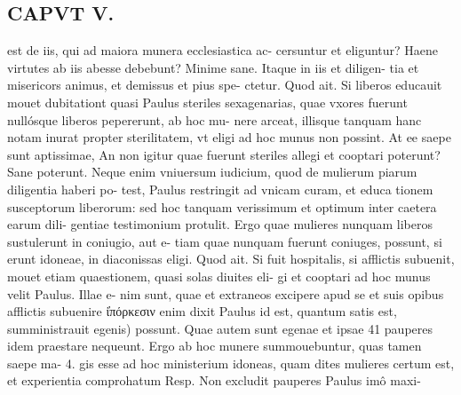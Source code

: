 \documentclass{article}
\begin{document}
\begin{pages}
\section*{CAPVT  V. }
\marginpar{[ p.273 ]}\pstart est de iis, qui ad maiora munera ecclesiastica ac- cersuntur et eliguntur? Haene virtutes ab iis abesse debebunt? Minime sane. Itaque in iis et diligen- tia et misericors animus, et demissus et pius spe- ctetur.  \pend\pstart Quod ait. Si liberos educauit mouet dubitationt quasi Paulus steriles sexagenarias, quae vxores fuerunt nullósque liberos pepererunt, ab hoc mu- nere arceat, illisque tanquam hanc notam inurat propter sterilitatem, vt eligi ad hoc munus non possint. At ee saepe sunt aptissimae, An non igitur quae fuerunt steriles allegi et cooptari poterunt? Sane poterunt. Neque enim vniuersum iudicium, quod de mulierum piarum diligentia haberi po- test, Paulus restringit ad vnicam curam, et educa tionem susceptorum liberorum: sed hoc tanquam verissimum et optimum inter caetera earum dili- gentiae testimonium protulit. Ergo quae mulieres nunquam liberos sustulerunt in coniugio, aut e- tiam quae nunquam fuerunt coniuges, possunt, si erunt idoneae, in diaconissas eligi.  \pend\pstart  Quod ait. Si fuit hospitalis, si afflictis subuenit, mouet etiam quaestionem, quasi solas diuites eli- gi et cooptari ad hoc munus velit Paulus. Illae e- nim sunt, quae et extraneos excipere apud se et suis opibus afflictis subuenire ἱ̓πόρκεσιν enim dixit Paulus id est, quantum satis est, sumministrauit egenis) possunt. Quae autem sunt egenae et ipsae 41 pauperes idem praestare nequeunt. Ergo ab hoc munere summouebuntur, quas tamen saepe ma- 4. gis esse ad hoc ministerium idoneas, quam dites mulieres certum est, et experientia comprohatum Resp. Non excludit pauperes Paulus imô maxi-  \pend

\end{pages}
\end{document}
